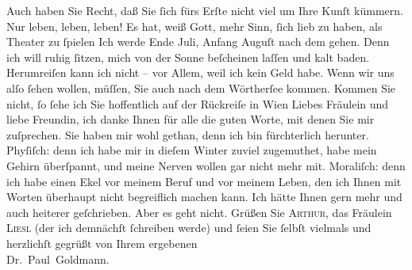 \begin{ledgroupsized}[t]{13cm}
           \pstart
           Auch haben Sie Recht, daß Sie ſich fürs Erſte nicht viel um Ihre Kunſt kümmern. Nur
               leben, leben, leben! Es hat, weiß Gott, mehr Sinn, ſich lieb zu haben, als Theater zu
                  ſpielen{\dotsfive}\pend
           \pstart
           Ich werde Ende Juli, Anfang Auguſt nach dem \label{K_L03528-4v}\label{K_L03528-4h}{ }{\pb}gehen. Denn ich will ruhig ſitzen, mich von der
               Sonne beſcheinen laſſen und kalt baden. Herumreiſen kann ich nicht – vor Allem, weil
               ich kein Geld habe. Wenn wir uns alſo ſehen wollen, müſſen, Sie auch nach dem Wörtherſee kommen. Kommen Sie nicht, ſo ſehe ich
               Sie hoffentlich auf der Rückreiſe in Wien\pend
           \pstart
           Liebes Fräulein und liebe Freundin, ich danke Ihnen für alle die guten Worte, mit
               denen Sie mir zuſprechen. Sie haben mir wohl gethan, denn ich bin fürchterlich
               herunter. {\pb}Phyſiſch: denn ich habe mir in dieſem
               Winter zuviel zugemuthet, habe mein Gehirn überſpannt, und meine Nerven wollen gar
               nicht mehr mit. Moraliſch: denn ich habe einen Ekel vor meinem Beruf und vor meinem
               Leben, den ich Ihnen mit Worten überhaupt nicht begreiflich machen kann. Ich hätte
               Ihnen gern mehr und auch heiterer geſchrieben. Aber es geht nicht. Grüßen Sie \textsc{Arthur}, das Fräulein \textsc{Liesl} (der ich demnächſt ſchreiben werde) und ſeien Sie ſelbſt vielmals und
               herzlichſt gegrüßt von Ihrem ergebenen {\\}\spacefill\mbox{Dr. Paul Goldmann.}\pend
           
         
         \endnumbering{}\end{ledgroupsized}\begin{anhang}\end{anhang}\newcommand{\dateiname}{L03528}\newcommand{\titel}{Paul Goldmann an Olga Gussmann, 28. 5. [1901]}\newcommand{\editorInnen}{Martin Anton Müller und Laura Untner}
      